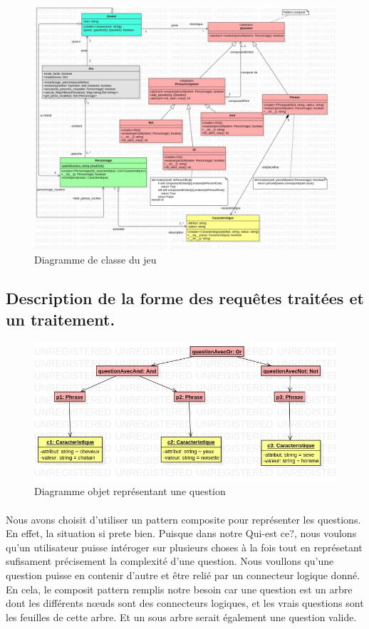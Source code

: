 \documentclass[a4paper]{article}
\begin{document}
\begin{figure}
  \caption{Diagramme de classe du jeu}
  \centering
  \includegraphics[scale=0.35]{./JeuClassDiagram.jpg}
\end{figure}

\clearpage
\subsection*{Description de la forme des requêtes traitées et un traitement.}
\begin{figure}
  \caption{Diagramme objet représentant une question}
  \centering
  \includegraphics[scale=0.4]{./requetesObject.jpg}
\end{figure}
\paragraph*{}
Nous avons choisit d'utiliser un pattern composite pour représenter les questions.
En effet, la situation si prete bien. Puisque dans notre Qui-est ce?, nous voulons qu'un utilisateur puisse intéroger sur plusieurs choses à la fois tout en représetant sufisament précisement la complexité d'une question.
Nous voullons qu'une question puisse en contenir d'autre et être relié par un connecteur logique donné.
En cela, le composit pattern remplis notre besoin car une question est un arbre dont les différents nœuds sont des connecteurs logiques, et les vrais questions sont les feuilles de cette arbre. Et un sous arbre serait également une question valide.
\end{document}
